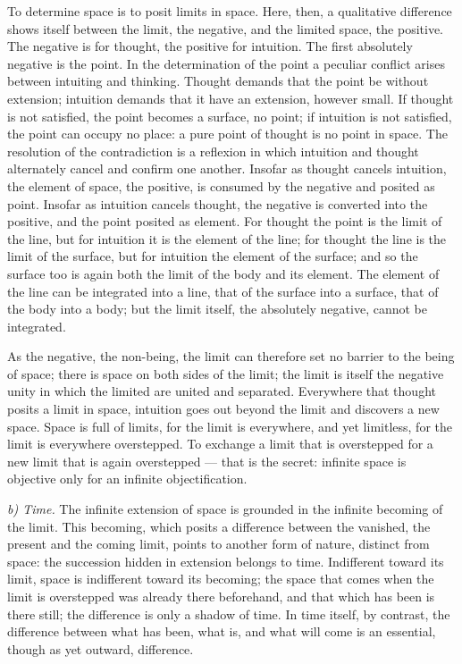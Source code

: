 \documentclass[12pt,a4paper]{book}
\newcommand{\runin}[1]{\emph{#1}\hspace{0.4em}}
\begin{document}
To determine space is to posit limits in space. Here, then, a qualitative
difference shows itself between the limit, the negative, and the limited space,
the positive. The negative is for thought, the positive for intuition. The first
absolutely negative is the point. In the determination of the point a peculiar
conflict arises between intuiting and thinking. Thought demands that the point be
without extension; intuition demands that it have an extension, however
small. If thought is not satisfied, the point becomes a surface, no point; if
intuition is not satisfied, the point can occupy no place: a pure point of thought
is no point in space. The resolution of the contradiction is a reflexion in which
intuition and thought alternately cancel and confirm one another. Insofar as
thought cancels intuition, the element of space, the positive, is consumed by the
negative and posited as point. Insofar as intuition cancels thought, the negative
is converted into the positive, and the point posited as element. For thought the
point is the limit of the line, but for intuition it is the element of the line;
for thought the line is the limit of the surface, but for intuition the element of
the surface; and so the surface too is again both the limit of the body and its
element. The element of the line can be integrated into a line, that of the
surface into a surface, that of the body into a body; but the limit itself, the
absolutely negative, cannot be integrated.

As the negative, the non-being, the limit can therefore set no barrier to the
being of space; there is space on both sides of the limit; the limit is itself the
negative unity in which the limited are united and separated. Everywhere that
thought posits a limit in space, intuition goes out beyond the limit and discovers
a new space. Space is full of limits, for the limit is everywhere, and yet
limitless, for the limit is everywhere overstepped. To exchange a limit that is
overstepped for a new limit that is again overstepped --- that is the secret:
infinite space is objective only for an infinite objectification.

\runin{b) Time.} The infinite extension of space is grounded in the infinite
becoming of the limit. This becoming, which posits a difference between the
vanished, the present and the coming limit, points to another form of nature,
distinct from space: the succession hidden in extension
belongs to time. Indifferent toward its limit, space is indifferent toward its
becoming; the space that comes when the limit is overstepped was already there
beforehand, and that which has been is there still; the difference is only a
shadow of time. In time itself, by contrast, the difference between what has been,
what is, and what will come is an essential, though as yet outward, difference.
\end{document}
